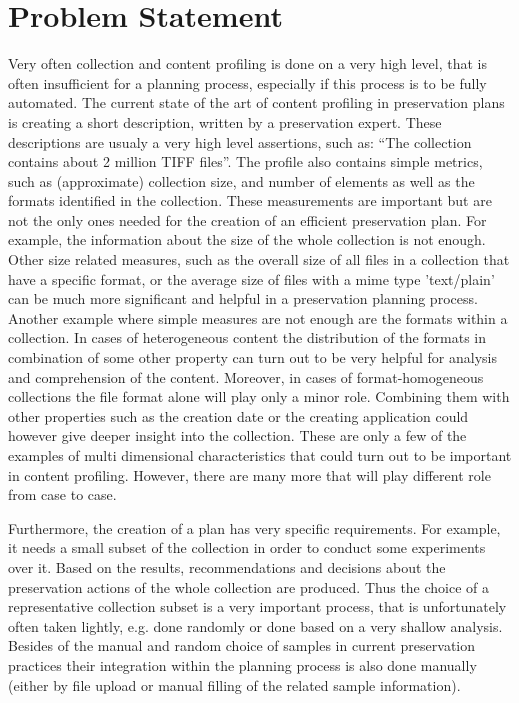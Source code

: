 \section{Problem Statement}
Very often collection and content profiling is done on a very high level, that
is often insufficient for a planning process, especially if this process is to be fully automated.
The current state of the art of content profiling in preservation plans is creating a short description, written by a preservation expert. These descriptions are usualy a very high level assertions, such as: ``The collection contains about 2 million TIFF files''. The profile also contains simple metrics, such as (approximate) collection size, and number of elements as well as the formats identified in the collection. 
These measurements are important but are not the only ones needed for the creation of an efficient preservation plan.
For example, the information about the size of the whole collection is not enough. Other size related measures, such as the overall size of all files in a collection that have a specific format, or the average size of files with a mime type 'text/plain' can be much more significant and helpful in a preservation planning process. Another example where simple measures are not enough are the formats within a collection. In cases of heterogeneous content the distribution of the formats in combination of some other property can turn out to be very helpful for analysis and comprehension of the content. Moreover, in cases of format-homogeneous collections the file format alone will play only a minor role. Combining them with other properties such as the creation date or the creating application could however give deeper insight into the collection.
These are only a few of the examples of multi dimensional characteristics that could turn out to be important in content profiling. However, there are many more that will play different role from case to case.

Furthermore, the creation of a plan has very specific requirements. For example, it needs a small subset of the collection in order to conduct some experiments over it. Based on the results, recommendations and decisions about the preservation actions of the whole collection are produced. Thus the choice of a representative collection subset is a very important process, that is unfortunately often taken lightly, e.g. done randomly or done based on a very shallow analysis. Besides of the manual and random choice of samples in current preservation practices their integration within the planning process is also done manually (either by file upload or manual filling of the related sample information).

